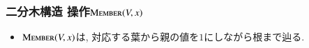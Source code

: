 \documentclass[main]{subfiles}
\begin{document}
\begin{frame}\frametitle{二分木構造 操作$\mathrm{\text{M\textsc{ember}}}(V,x)$}
\begin{itemize}
\item $\mathrm{\text{M\textsc{ember}}}(V,x)$は, 対応する葉から親の値を$1$にしながら根まで辿る.
\end{itemize}
 

\end{frame}
\end{document}

